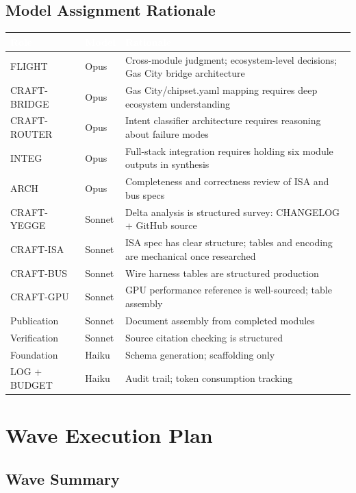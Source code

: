 \documentclass[11pt,letterpaper]{article}
\newcommand{\tableheader}[1]{\textbf{\sffamily\textcolor{white}{#1}}}
\begin{document}
\subsection{Model Assignment Rationale}

\begin{center}
\begin{tabularx}{\textwidth}{L{2.5cm}C{2cm}X}
\toprule
{}
\tableheader{Role} & \tableheader{Model} & \tableheader{Rationale} \\
\midrule
FLIGHT & Opus & Cross-module judgment; ecosystem-level decisions; Gas City bridge architecture \\
CRAFT-BRIDGE & Opus & Gas City/chipset.yaml mapping requires deep ecosystem understanding \\
CRAFT-ROUTER & Opus & Intent classifier architecture requires reasoning about failure modes \\
INTEG & Opus & Full-stack integration requires holding six module outputs in synthesis \\
ARCH & Opus & Completeness and correctness review of ISA and bus specs \\
CRAFT-YEGGE & Sonnet & Delta analysis is structured survey: CHANGELOG + GitHub source \\
CRAFT-ISA & Sonnet & ISA spec has clear structure; tables and encoding are mechanical once researched \\
CRAFT-BUS & Sonnet & Wire harness tables are structured production \\
CRAFT-GPU & Sonnet & GPU performance reference is well-sourced; table assembly \\
Publication & Sonnet & Document assembly from completed modules \\
Verification & Sonnet & Source citation checking is structured \\
Foundation & Haiku & Schema generation; scaffolding only \\
LOG + BUDGET & Haiku & Audit trail; token consumption tracking \\
\bottomrule
\end{tabularx}
\end{center}

\section{Wave Execution Plan}

\subsection{Wave Summary}
\end{document}
